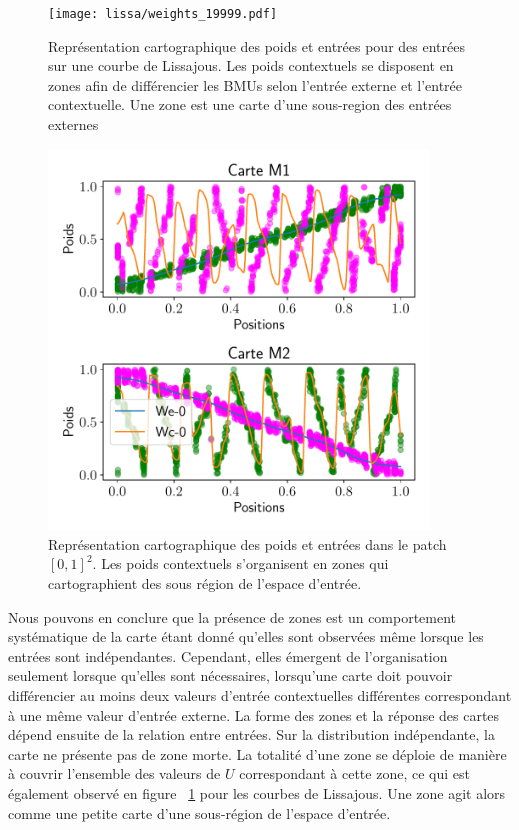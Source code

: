 \documentclass[../main]{subfiles}
\begin{document}
	\begin{figure}[H]
		\centering\texttt{[image: lissa/weights\_19999.pdf]}
		\vspace{-0.5cm}
		\caption{Représentation cartographique des poids et entrées pour des entrées sur une courbe de Lissajous. Les poids contextuels se disposent en zones afin de différencier les BMUs selon l'entrée externe et l'entrée contextuelle. Une zone est une carte d'une sous-region des entrées externes \label{fig:lissa}}
	\end{figure}
\begin{figure}[H]
	\centering\includegraphics[width=0.9\textwidth]{2som_square_w.pdf}
	\vspace{-0.7cm}
	\caption{Représentation cartographique des poids et entrées dans le patch $[0,1]^2$. Les poids contextuels s'organisent en zones qui cartographient des sous région de l'espace d'entrée. \label{fig:ind}}
\end{figure}

Nous pouvons en conclure que la présence de zones est un comportement systématique de la carte étant donné qu'elles sont observées même lorsque les entrées sont indépendantes. 
Cependant, elles émergent de l'organisation seulement lorsque qu'elles sont nécessaires, lorsqu'une carte doit pouvoir différencier au moins deux valeurs d'entrée contextuelles différentes correspondant à une même valeur d'entrée externe.
La forme des zones et la réponse des cartes dépend ensuite de la relation entre entrées.
Sur la distribution indépendante, la carte ne présente pas de zone morte. La totalité d'une zone se déploie de manière à couvrir l'ensemble des valeurs de $U$ correspondant à cette zone, ce qui est également observé en figure ~\ref{fig:lissa} pour les courbes de Lissajous. Une zone agit alors comme une petite carte d'une sous-région de l'espace d'entrée. 
\end{document}
